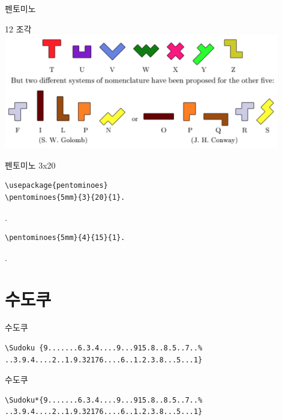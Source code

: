 \documentclass[xcolor=svgnames]{beamer}
\begin{document}
%
\begin{frame}{펜토미노}
  \begin{center}
  {\Large 12 조각} \\
  \includegraphics[height=5cm]{imgs/pentominoes.png}
  \end{center}
\end{frame}

%
\begin{frame}[fragile]{펜토미노 3x20}
\begin{verbatim}
\usepackage{pentominoes}
\pentominoes{5mm}{3}{20}{1}.
\end{verbatim}
.
\begin{verbatim}
\pentominoes{5mm}{4}{15}{1}.
\end{verbatim}
.
\end{frame}


\section{수도쿠}

%
\begin{frame}[fragile]{수도쿠}
\begin{verbatim}
\Sudoku {9.......6.3.4....9...915.8..8.5..7..%
..3.9.4....2..1.9.32176....6..1.2.3.8...5...1}
\end{verbatim}  
\begin{center}
\end{center}
\end{frame}

%
\begin{frame}[fragile]{수도쿠}
\begin{verbatim}
\Sudoku*{9.......6.3.4....9...915.8..8.5..7..%
..3.9.4....2..1.9.32176....6..1.2.3.8...5...1}
\end{verbatim}
\begin{center}
\end{center}
\end{frame}
\end{document}
